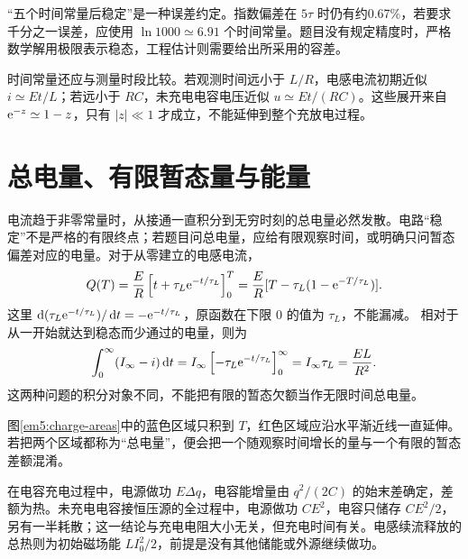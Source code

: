 “五个时间常量后稳定”是一种误差约定。指数偏差在 $5\tau$ 时仍有约0.67\%，若要求千分之一误差，应使用 $\ln1000\simeq6.91$ 个时间常量。题目没有规定精度时，严格数学解用极限表示稳态，工程估计则需要给出所采用的容差。

时间常量还应与测量时段比较。若观测时间远小于 $L/R$，电感电流初期近似 $i\simeq Et/L$；若远小于 $RC$，未充电电容电压近似 $u\simeq Et/(RC)$。这些展开来自 $\mathrm e^{-z}\simeq1-z$，只有 $|z|\ll1$ 才成立，不能延伸到整个充放电过程。


\section{总电量、有限暂态量与能量}

电流趋于非零常量时，从接通一直积分到无穷时刻的总电量必然发散。电路“稳定”不是严格的有限终点；若题目问总电量，应给有限观察时间，或明确只问暂态偏差对应的电量。对于从零建立的电感电流，
\[
Q(T)=\frac ER\left[t+\tau_L\mathrm e^{-t/\tau_L}\right]_0^T
=\frac ER[T-\tau_L(1-\mathrm e^{-T/\tau_L})].
\]
这里 $\mathop{}\!\mathrm d(\tau_L\mathrm e^{-t/\tau_L})/\mathop{}\!\mathrm d t=-\mathrm e^{-t/\tau_L}$，原函数在下限 $0$ 的值为 $\tau_L$，不能漏减。
相对于从一开始就达到稳态而少通过的电量，则为
\[
\int_0^\infty(I_\infty-i)\mathop{}\!\mathrm d t
=I_\infty\left[-\tau_L\mathrm e^{-t/\tau_L}\right]_0^\infty
=I_\infty\tau_L=\frac{EL}{R^2}.
\]这两种问题的积分对象不同，不能把有限的暂态欠额当作无限时间总电量。

图\ref{em5:charge-areas}中的蓝色区域只积到 $T$，红色区域应沿水平渐近线一直延伸。若把两个区域都称为“总电量”，便会把一个随观察时间增长的量与一个有限的暂态差额混淆。


在电容充电过程中，电源做功 $E\Delta q$，电容能增量由 $q^2/(2C)$ 的始末差确定，差额为热。未充电电容接恒压源的全过程中，电源做功 $CE^2$，电容只储存 $CE^2/2$，另有一半耗散；这一结论与充电电阻大小无关，但充电时间有关。电感续流释放的总热则为初始磁场能 $LI_0^2/2$，前提是没有其他储能或外源继续做功。


